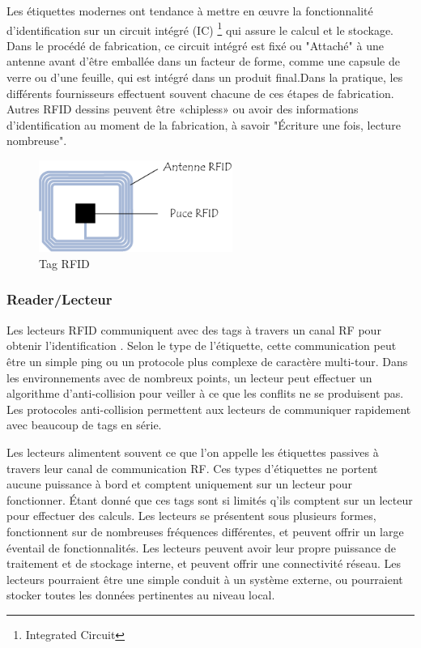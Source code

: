 \documentclass[11pt, a4paper, twoside]{book}
\begin{document}
Les étiquettes modernes ont tendance à mettre en œuvre la fonctionnalité d'identification sur un circuit intégré (IC) \footnote{Integrated Circuit} qui
assure le calcul et le stockage. Dans le procédé de fabrication, ce circuit intégré est fixé ou
"Attaché" à une antenne avant d'être emballée dans un facteur de forme, comme une capsule de verre ou d'une feuille, qui est intégré dans un produit final.Dans la pratique, les différents fournisseurs effectuent souvent chacune de ces étapes de fabrication. Autres RFID
dessins peuvent être «chipless» ou avoir des informations d'identification au moment de la fabrication, à savoir
"Écriture une fois, lecture nombreuse". \\
\begin{figure}[H]
\centering
\includegraphics[height=3cm]{tag}
\caption{Tag RFID}
\end{figure}
\subsubsection{Reader/Lecteur}
Les lecteurs RFID communiquent avec des tags à travers un canal RF pour obtenir l'identification
. Selon le type de l'étiquette, cette communication peut être un simple ping ou un protocole plus complexe de caractère multi-tour. Dans les environnements avec de nombreux points, un lecteur peut effectuer un algorithme d'anti-collision pour veiller à ce que les conflits ne se produisent pas. Les protocoles anti-collision permettent aux lecteurs de communiquer rapidement avec beaucoup de tags en série.

Les lecteurs alimentent souvent ce que l'on appelle les étiquettes passives à travers leur canal de communication RF.
Ces types d'étiquettes ne portent aucune puissance à bord et comptent uniquement sur un lecteur pour fonctionner. Étant donné que ces tags sont si limités q'ils comptent sur un lecteur pour effectuer des calculs.
Les lecteurs se présentent sous plusieurs formes, fonctionnent sur de nombreuses fréquences différentes, et peuvent offrir un large éventail de fonctionnalités. Les lecteurs peuvent avoir leur propre puissance de traitement et de stockage interne, et peuvent offrir une connectivité réseau. Les lecteurs pourraient être une simple conduit à un système externe, ou pourraient stocker toutes les données pertinentes au niveau local.
\end{document}
